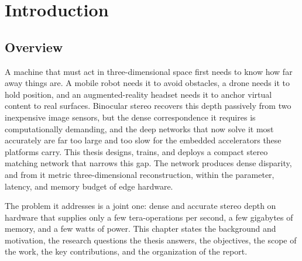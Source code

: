 \chapter{Introduction}
\label{ch:intro}

\section{Overview}
A machine that must act in three-dimensional space first needs to know
how far away things are. A mobile robot needs it to avoid obstacles, a
drone needs it to hold position, and an augmented-reality headset needs
it to anchor virtual content to real surfaces. Binocular stereo recovers
this depth passively from two inexpensive image sensors, but the dense
correspondence it requires is computationally demanding, and the deep
networks that now solve it most accurately are far too large and too slow
for the embedded accelerators these platforms carry. This thesis designs,
trains, and deploys a compact stereo matching network that narrows this
gap. The network produces dense disparity, and from it metric
three-dimensional reconstruction, within the parameter, latency, and
memory budget of edge hardware.

The problem it addresses is a joint one: dense and accurate stereo depth
on hardware that supplies only a few tera-operations per second, a few
gigabytes of memory, and a few watts of power. This chapter states the
background and motivation, the research questions the thesis answers, the
objectives, the scope of the work, the key contributions, and the
organization of the report.

\FloatBarrier
